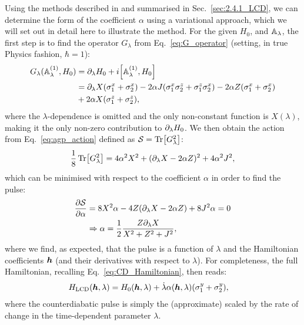 Using the methods described in \cite{sels_minimizing_2017} and summarised in Sec.~\ref{sec:2.4.1_LCD}, we can determine the form of the coefficient $\alpha$ using a variational approach, which we will set out in detail here to illustrate the method. For the given $H_0$, and $\mathbb{A}_{\lambda}$, the first step is to find the operator $G_{\lambda}$ from Eq.~\eqref{eq:G_operator} (setting, in true Physics fashion, $\hbar = 1$):
\begin{equation}
    \begin{aligned}
        G_{\lambda}(\approxAGP^{(1)}, H_0) &= \dlambda H_0 + i \comm{\approxAGP^{(1)}}{H_0} \\
        &= \dlambda {X} (\sx_{1} + \sx_{2}) - 2 \alpha J (\sx_1\sz_2 + \sz_1\sx_2) - 2 \alpha Z (\sx_{1} + \sx_{2}) \\
        &+ 2 \alpha X (\sz_{1} + \sz_{2}),
    \end{aligned}
\end{equation}
where the $\lambda$-dependence is omitted and the only non-constant function is $X(\lambda)$, making it the only non-zero contribution to $\partial_{\lambda} H_0$. We then obtain the action from Eq.~\eqref{eq:agp_action} defined as $\mathcal{S} = \Tr[G^2_{\lambda}]$:
\begin{equation}
    \frac{1}{8} \Tr[G^2_{\lambda}] = 4 \alpha^2 X^2 + (\partial_{\lambda} X - 2 \alpha Z)^2 + 4 \alpha^2 J^2,
\end{equation}
which can be minimised with respect to the coefficient $\alpha$ in order to find the  pulse:
\begin{equation}
    \begin{aligned}
        \frac{\partial \mathcal{S}}{\partial \alpha} &= 8X^2\alpha - 4Z(\partial_{\lambda} X - 2 \alpha Z) + 8 J^2 \alpha = 0 \\
        & \Rightarrow \alpha = \frac{1}{2} \frac{Z \partial_{\lambda} X}{X^2 + Z^2 + J^2},
    \end{aligned}
\end{equation}
where we find, as expected, that the  pulse is a function of $\lambda$ and the Hamiltonian coefficients $\boldsymbol{h}$ (and their derivatives with respect to $\lambda$). For completeness, the full  Hamiltonian, recalling Eq.~\eqref{eq:CD_Hamiltonian}, then reads:
\begin{equation}\label{eq:FO_LCD_H}
    \begin{aligned}
        H_{\rm LCD}(\boldsymbol{h}, \lambda) &= H_0(\boldsymbol{h}, \lambda) + \dot{\lambda} \alpha(\boldsymbol{h}, \lambda) (\sigma^y_{1} + \sigma^y_{2}),
    \end{aligned}
\end{equation}
where the counterdiabatic pulse is simply the (approximate)  scaled by the rate of change in the time-dependent parameter $\lambda$.

